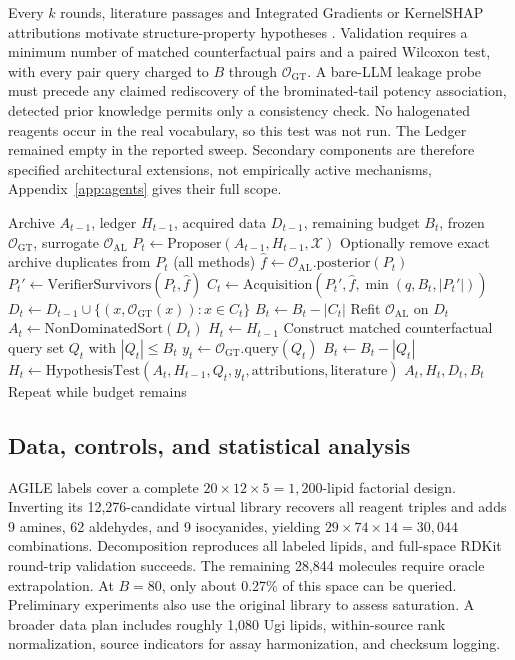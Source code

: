 \documentclass[11pt]{article}
\begin{document}
Every $k$ rounds, literature passages and Integrated Gradients or KernelSHAP attributions motivate structure-property hypotheses \citep{sundararajan2017,lundberg2017}. Validation requires a minimum number of matched counterfactual pairs and a paired Wilcoxon test, with every pair query charged to $B$ through $\mathcal O_{\mathrm{GT}}$. A bare-LLM leakage probe must precede any claimed rediscovery of the brominated-tail potency association, detected prior knowledge permits only a consistency check. No halogenated reagents occur in the real vocabulary, so this test was not run. The Ledger remained empty in the reported sweep. Secondary components are therefore specified architectural extensions, not empirically active mechanisms, Appendix~\ref{app:agents} gives their full scope.

\begin{algorithm}[t]
\caption{Budget-accounted LEAF round}
\label{alg:leaf}
\begin{algorithmic}[1]
\Require Archive $A_{t-1}$, ledger $H_{t-1}$, acquired data $D_{t-1}$, remaining budget $B_t$, frozen $\mathcal O_{\mathrm{GT}}$, surrogate $\mathcal O_{\mathrm{AL}}$
\State $P_t\gets\mathrm{Proposer}(A_{t-1},H_{t-1},\mathcal X)$
\State Optionally remove exact archive duplicates from $P_t$ (all methods)
\State $\hat f\gets\mathcal O_{\mathrm{AL}}.\mathrm{posterior}(P_t)$
\State $P_t'\gets\mathrm{VerifierSurvivors}(P_t,\hat f)$
\State $C_t\gets\mathrm{Acquisition}(P_t',\hat f,\min(q,B_t,|P_t'|))$
\State $D_t\gets D_{t-1}\cup\{(x,\mathcal O_{\mathrm{GT}}(x)):x\in C_t\}$
\State $B_t\gets B_t-|C_t|$
\State Refit $\mathcal O_{\mathrm{AL}}$ on $D_t$
\State $A_t\gets\mathrm{NonDominatedSort}(D_t)$
\State $H_t\gets H_{t-1}$
\State Construct matched counterfactual query set $Q_t$ with $|Q_t|\le B_t$
\State $y_t\gets\mathcal O_{\mathrm{GT}}.\mathrm{query}(Q_t)$
\State $B_t\gets B_t-|Q_t|$
\State $H_t\gets\mathrm{HypothesisTest}(A_t,H_{t-1},Q_t,y_t,\text{attributions},\text{literature})$
\EndIf
\State \Return $A_t,H_t,D_t,B_t$
\State Repeat while budget remains
\end{algorithmic}
\end{algorithm}

\subsection{Data, controls, and statistical analysis}
\label{sec:protocol}
AGILE labels cover a complete $20\times12\times5=1{,}200$-lipid factorial design. Inverting its 12,276-candidate virtual library recovers all reagent triples and adds 9 amines, 62 aldehydes, and 9 isocyanides, yielding $29\times74\times14=30{,}044$ combinations. Decomposition reproduces all labeled lipids, and full-space RDKit round-trip validation succeeds. The remaining 28,844 molecules require oracle extrapolation. At $B=80$, only about 0.27\% of this space can be queried. Preliminary experiments also use the original library to assess saturation. A broader data plan includes roughly 1,080 Ugi lipids, within-source rank normalization, source indicators for assay harmonization, and checksum logging. 
\end{document}
